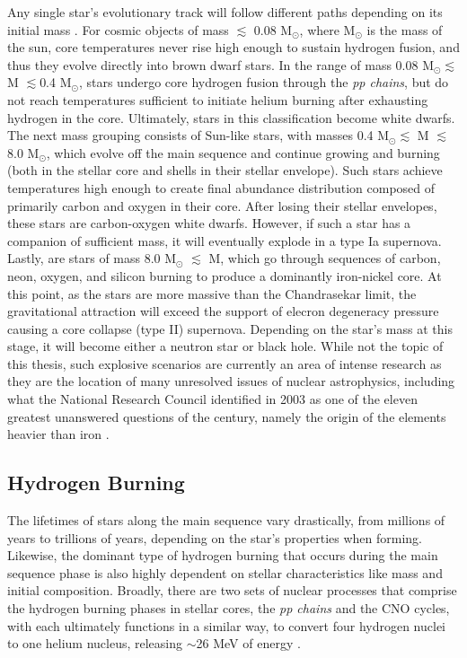 Any single star's evolutionary track will follow different paths depending on its initial mass \cite{IliadisBook, RyanNortonBook}.  For cosmic objects of mass $\lesssim$ 0.08 M$_{\odot}$, where M$_{\odot}$ is the mass of the sun, core temperatures never rise high enough to sustain hydrogen fusion, and thus they evolve directly into brown dwarf stars. In the range of mass 0.08 M$_{\odot} \lesssim$ M $\lesssim$0.4 M$_{\odot}$, stars undergo core hydrogen fusion through the \textit{pp chains}, but do not reach temperatures sufficient to initiate helium burning after exhausting hydrogen in the core. Ultimately, stars in this classification become white dwarfs. The next mass grouping consists of Sun-like stars, with masses 0.4 M$_{\odot} \lesssim$ M $\lesssim$ 8.0 M$_{\odot}$, which evolve off the main sequence and continue growing and burning (both in the stellar core and shells in their stellar envelope). Such stars achieve temperatures high enough to create final abundance distribution composed of primarily carbon and oxygen in their core. After losing their stellar envelopes, these stars are carbon-oxygen white dwarfs. However, if such a star has a companion of sufficient mass, it will eventually explode in a type Ia supernova. Lastly, are stars of mass 8.0 M$_{\odot}$ $\lesssim$ M, which go through sequences of carbon, neon, oxygen, and silicon burning to produce a dominantly iron-nickel core. At this point, as the stars are more massive than the Chandrasekar limit, the gravitational attraction will exceed the support of elecron degeneracy pressure causing a core collapse (type II) supernova. Depending on the star's mass at this stage, it will become either a neutron star or black hole. While not the topic of this thesis, such explosive scenarios are currently an area of intense research as they are the location of many unresolved issues of nuclear astrophysics, including what the National Research Council identified in 2003 as one of the eleven greatest unanswered questions of the century, namely the origin of the elements heavier than iron \cite{Turner2003}.


\subsection{Hydrogen Burning}

The lifetimes of stars along the main sequence vary drastically, from millions of years to trillions of years, depending on the star's properties when forming. Likewise, the dominant type of hydrogen burning that occurs during the main sequence phase is also highly dependent on stellar characteristics like mass and initial composition. Broadly, there are two sets of nuclear processes that comprise the hydrogen burning phases in stellar cores, the \textit{pp chains} and the CNO cycles, with each ultimately functions in a similar way, to convert four hydrogen nuclei to one helium nucleus, releasing $ \sim$26 MeV of energy \cite{RolfsBook}. 

